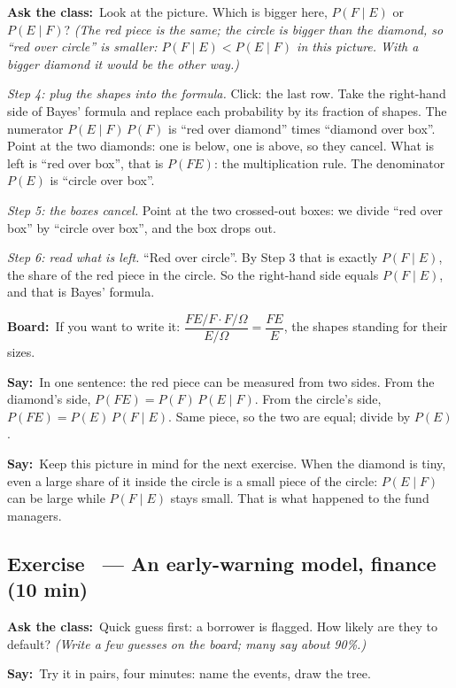 \documentclass[11pt,a4paper,parskip=half]{scrartcl}
\newcommand{\Om}{\Omega}
\newcommand{\say}{\textbf{\color{teal}Say:}\ }
\newcommand{\board}{\textbf{\color{gold}Board:}\ }
\newcommand{\ask}{\textbf{\color{navy}Ask the class:}\ }
\begin{document}
\begin{printskip}
\ask Look at the picture. Which is bigger here, $P(F\mid E)$ or
$P(E\mid F)$? \emph{(The red piece is the same; the circle is bigger than
the diamond, so ``red over circle'' is smaller: $P(F\mid E)<P(E\mid F)$
in this picture. With a bigger diamond it would be the other way.)}

\emph{Step 4: plug the shapes into the formula.} Click: the last row.
Take the right-hand side of Bayes' formula and replace each probability
by its fraction of shapes. The numerator $P(E\mid F)\,P(F)$ is ``red over
diamond'' times ``diamond over box''. Point at the two diamonds: one is
below, one is above, so they cancel. What is left is ``red over box'',
that is $P(FE)$: the multiplication rule. The denominator $P(E)$ is
``circle over box''.

\emph{Step 5: the boxes cancel.} Point at the two crossed-out boxes: we
divide ``red over box'' by ``circle over box'', and the box drops out.

\emph{Step 6: read what is left.} ``Red over circle''. By Step 3 that is
exactly $P(F\mid E)$, the share of the red piece in the circle. So the
right-hand side equals $P(F\mid E)$, and that is Bayes' formula.

\board If you want to write it: $\dfrac{FE/F\cdot F/\Om}{E/\Om}=
	\dfrac{FE}{E}$, the shapes standing for their sizes.

\say In one sentence: the red piece can be measured from two sides.
From the diamond's side, $P(FE)=P(F)\,P(E\mid F)$. From the circle's side,
$P(FE)=P(E)\,P(F\mid E)$. Same piece, so the two are equal; divide by
$P(E)$.

\say Keep this picture in mind for the next exercise. When the diamond is
tiny, even a large share of it inside the circle is a small piece of the
circle: $P(E\mid F)$ can be large while $P(F\mid E)$ stays small. That is
what happened to the fund managers.
\end{printskip}

\subsection{Exercise~ --- An early-warning model, finance (10 min)}


\ask Quick guess first: a borrower is flagged. How likely are they to
default? \emph{(Write a few guesses on the board; many say about 90\%.)}

\say Try it in pairs, four minutes: name the events, draw the tree.
\end{document}
